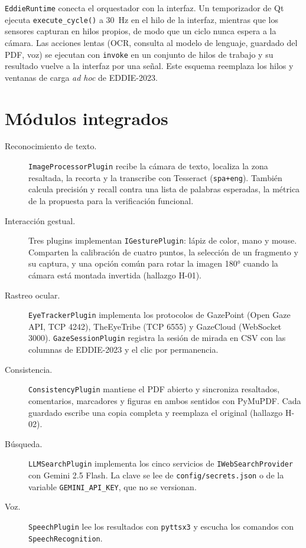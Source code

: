 \texttt{EddieRuntime} conecta el orquestador con la interfaz. Un temporizador de Qt ejecuta \texttt{execute\_cycle()} a 30~Hz en el hilo de la interfaz, mientras que los sensores capturan en hilos propios, de modo que un ciclo nunca espera a la cámara. Las acciones lentas (OCR, consulta al modelo de lenguaje, guardado del PDF, voz) se ejecutan con \texttt{invoke} en un conjunto de hilos de trabajo y su resultado vuelve a la interfaz por una señal. Este esquema reemplaza los hilos y ventanas de carga \textit{ad hoc} de EDDIE-2023.

\section{Módulos integrados}

\begin{description}
  \item[Reconocimiento de texto.] \texttt{ImageProcessorPlugin} recibe la cámara de texto, localiza la zona resaltada, la recorta y la transcribe con Tesseract (\texttt{spa+eng}). También calcula precisión y recall contra una lista de palabras esperadas, la métrica de la propuesta para la verificación funcional.
  \item[Interacción gestual.] Tres plugins implementan \texttt{IGesturePlugin}: lápiz de color, mano y mouse. Comparten la calibración de cuatro puntos, la selección de un fragmento y su captura, y una opción común para rotar la imagen 180° cuando la cámara está montada invertida (hallazgo H-01).
  \item[Rastreo ocular.] \texttt{EyeTrackerPlugin} implementa los protocolos de GazePoint (Open Gaze API, TCP 4242), TheEyeTribe (TCP 6555) y GazeCloud (WebSocket 3000). \texttt{GazeSessionPlugin} registra la sesión de mirada en CSV con las columnas de EDDIE-2023 y el clic por permanencia.
  \item[Consistencia.] \texttt{ConsistencyPlugin} mantiene el PDF abierto y sincroniza resaltados, comentarios, marcadores y figuras en ambos sentidos con PyMuPDF. Cada guardado escribe una copia completa y reemplaza el original (hallazgo H-02).
  \item[Búsqueda.] \texttt{LLMSearchPlugin} implementa los cinco servicios de \texttt{IWebSearchProvider} con Gemini 2.5 Flash. La clave se lee de \texttt{config/secrets.json} o de la variable \texttt{GEMINI\_API\_KEY}, que no se versionan.
  \item[Voz.] \texttt{SpeechPlugin} lee los resultados con \texttt{pyttsx3} y escucha los comandos con \texttt{SpeechRecognition}.
\end{description}


